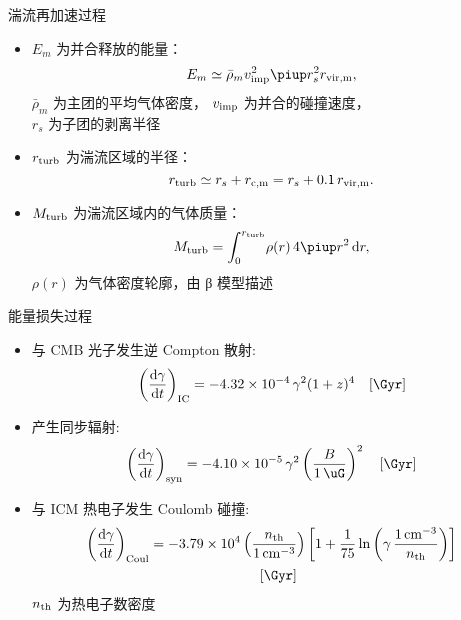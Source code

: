 \documentclass{beamer}
\begin{document}
\begin{frame}
  \vspace{1ex}
  \begin{alertblock}{湍流再加速过程}
    \smallskip
    \begin{itemize}
      \item $E_m$ 为并合释放的能量：
        \begin{equation}
          E_m \simeq \bar{\rho}_m v_{\R{imp}}^2
            \Cpi r_s^2 r_{\R{vir,m}} ,
        \end{equation}
        $\bar{\rho}_m$ 为主团的平均气体密度，
        $v_{\text{imp}}$ 为并合的碰撞速度，\\
        $r_s$ 为子团的剥离半径
      \item $r_{\text{turb}}$ 为湍流区域的半径：
        \begin{equation}
          r_{\text{turb}} \simeq r_s + r_{\text{c,m}}
            = r_s + 0.1\,r_{\text{vir,m}} .
        \end{equation}
      \item $M_{\text{turb}}$ 为湍流区域内的气体质量：
        \begin{equation}
          M_{\R{turb}} =
            \int_0^{r_{\R{turb}}} \! \rho(r) \,4\Cpi r^2 \,\D{r} ,
        \end{equation}
        $\rho(r)$ 为气体密度轮廓，由 β 模型描述
    \end{itemize}
  \end{alertblock}
\end{frame}

\begin{frame}
  \vspace{1ex}
  \begin{alertblock}{能量损失过程}
    \smallskip
    \begin{itemize}
      \item 与 CMB 光子发生逆 Compton 散射:
        \begin{equation}
          \left( \diff{\gamma}{t} \right)_{\R{IC}} =
            \num{-4.32e-4} \,\gamma^2 (1+z)^4
            \quad [\si{\per\Gyr}]
        \end{equation}
      \item 产生同步辐射:
        \begin{equation}
          \left( \diff{\gamma}{t} \right)_{\R{syn}} =
            \num{-4.10e-5} \,\gamma^2
            \left( \frac{B}{\SI{1}{\uG}} \right)^2
            \quad [\si{\per\Gyr}]
        \end{equation}
      \item 与 ICM 热电子发生 Coulomb 碰撞:
        \begin{multline}
          \left( \diff{\gamma}{t} \right)_{\R{Coul}} =
            \num{-3.79e4} \left( \frac{n_{\R{th}}}{\SI{1}{\per\cm\cubed}} \right)
            \left[ 1 + \frac{1}{75} \ln \left(
              \gamma\,\frac{\SI{1}{\per\cm\cubed}}{n_{\R{th}}} \right) \right]
            \\ \quad [\si{\per\Gyr}]
        \end{multline}
        $n_{\text{th}}$ 为热电子数密度
    \end{itemize}
  \end{alertblock}
\end{frame}
\end{document}
